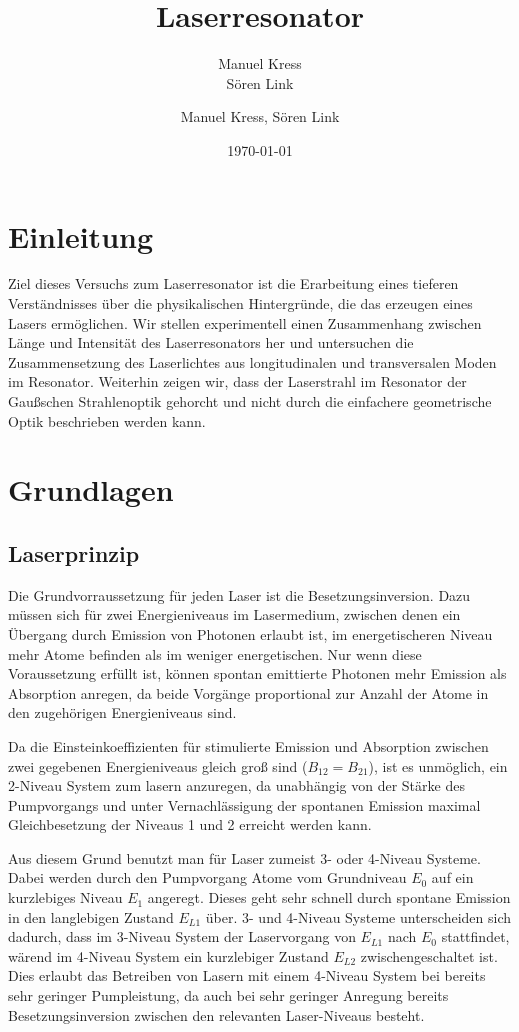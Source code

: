 \documentclass[bigchapter,colorback,accentcolor=tud4b,linedtoc,11pt]{tudreport}
\title{Laserresonator}
\subtitle{Manuel Kress  \\Sören Link}
\author{Manuel Kress, Sören Link}
\date{\today}
\numberwithin{equation}{subsection}
\begin{document}

\maketitle

\tableofcontents


\chapter{Einleitung}
Ziel dieses Versuchs zum Laserresonator ist die Erarbeitung eines tieferen Verständnisses über die physikalischen Hintergründe, die das erzeugen eines Lasers ermöglichen.
Wir stellen experimentell einen Zusammenhang zwischen Länge und Intensität des Laserresonators her und untersuchen die Zusammensetzung des Laserlichtes aus longitudinalen und transversalen Moden im Resonator. Weiterhin zeigen wir, dass der Laserstrahl im Resonator der Gaußschen Strahlenoptik gehorcht und nicht durch die einfachere geometrische Optik beschrieben werden kann.
\chapter{Grundlagen}
\section{Laserprinzip}
Die Grundvorraussetzung für jeden Laser ist die Besetzungsinversion. Dazu müssen sich für zwei Energieniveaus im Lasermedium, zwischen denen ein Übergang durch Emission von Photonen erlaubt ist, im energetischeren Niveau mehr Atome befinden als im weniger energetischen. Nur wenn diese Voraussetzung erfüllt ist, können spontan emittierte Photonen mehr Emission als Absorption anregen, da beide Vorgänge proportional zur Anzahl der Atome in den zugehörigen Energieniveaus sind.

Da die Einsteinkoeffizienten für stimulierte Emission und Absorption zwischen zwei gegebenen Energieniveaus gleich groß sind ($B_{12}=B_{21}$), ist es unmöglich, ein 2-Niveau System zum lasern anzuregen, da unabhängig von der Stärke des Pumpvorgangs und unter Vernachlässigung der spontanen Emission maximal Gleichbesetzung der Niveaus 1 und 2 erreicht werden kann.

Aus diesem Grund benutzt man für Laser zumeist 3- oder 4-Niveau Systeme. Dabei werden durch den Pumpvorgang Atome vom Grundniveau $E_0$ auf ein kurzlebiges Niveau $E_1$ angeregt. Dieses geht sehr schnell durch spontane Emission in den langlebigen Zustand $E_{L1}$ über. 3- und 4-Niveau Systeme unterscheiden sich dadurch, dass im 3-Niveau System der Laservorgang von $E_{L1}$ nach $E_{0}$ stattfindet, wärend im 4-Niveau System ein kurzlebiger Zustand $E_{L2}$ zwischengeschaltet ist. Dies erlaubt das Betreiben von Lasern mit einem 4-Niveau System bei bereits sehr geringer Pumpleistung, da auch bei sehr geringer Anregung bereits Besetzungsinversion zwischen den relevanten Laser-Niveaus besteht.
\end{document}
